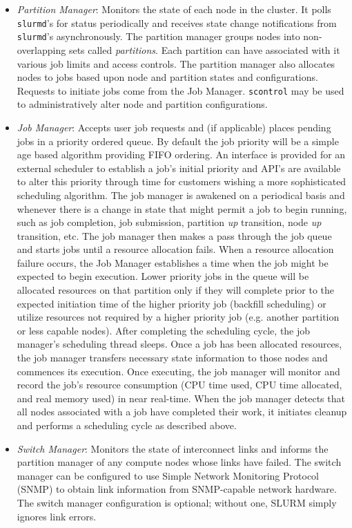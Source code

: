 \begin{itemize}
\item {\em Partition Manager}: Monitors the state of each 
node in the cluster.  It polls {\tt slurmd}'s for status periodically and 
receives state change notifications from {\tt slurmd}'s asynchronously.
The partition manager groups nodes into non-overlapping sets 
called {\em partitions}. Each partition can have associated with 
it various job limits and access controls.
The partition manager also allocates nodes to jobs based upon 
node and partition states and configurations. Requests to initiate 
jobs come from the Job Manager.
{\tt scontrol} may be used to administratively alter node and 
partition configurations.

\item {\em Job Manager}: Accepts user job requests and (if applicable) 
places pending jobs in a priority ordered queue. By default the job 
priority will be a simple age based algorithm providing FIFO ordering. 
An interface is provided for an external scheduler to establish 
a job's initial priority and API's are available to alter this priority 
through time for customers wishing a more sophisticated scheduling algorithm.
The job manager is awakened on a periodical basis and whenever there 
is a change in state that might permit a job to begin running, such as 
job completion, job submission, partition {\em up} transition, node {\em up} 
transition, etc.
The job manager then makes a pass through the job queue and
starts jobs until a resource allocation fails. 
When a resource allocation failure occurs, the Job Manager establishes 
a time when the job might be expected to begin execution. 
Lower priority jobs in the queue will be allocated resources on that 
partition only if they will complete prior to the expected initiation 
time of the higher priority job (backfill scheduling) or utilize 
resources not required by a higher priority job (e.g. another partition 
or less capable nodes).
After completing the scheduling cycle, the job manager's scheduling 
thread sleeps.
Once a job has been allocated resources, the job manager transfers 
necessary state information to those nodes and commences its execution. 
Once executing, the job manager will monitor and record the job's resource 
consumption (CPU time used, CPU time allocated, and real memory used) 
in near real-time.
When the job manager detects that all nodes associated with a 
job have completed their work, it initiates cleanup and performs a 
scheduling cycle as described above.

\item {\em Switch Manager}:  Monitors the state of interconnect links 
and informs the partition manager of any compute nodes whose links
have failed.  The switch manager can be configured
to use Simple Network Monitoring Protocol (SNMP) to obtain link
information from SNMP-capable network hardware.
The switch manager configuration is optional;  without one, 
SLURM simply ignores link errors.

\end{itemize}

